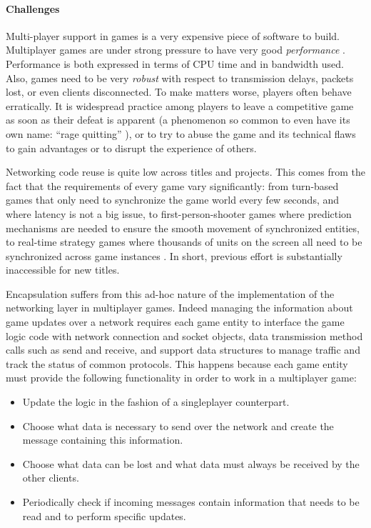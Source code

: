 \paragraph{Challenges}
Multi-player support in games is a very expensive piece of software to build. Multiplayer games are under strong pressure to have very good \textit{performance} \cite{claypool2006latency}. Performance is both expressed in terms of CPU time and in bandwidth used. Also, games need to be very \textit{robust} with respect to transmission delays, packets lost, or even clients disconnected. To make matters worse, players often behave erratically. It is widespread practice among players to leave a competitive game as soon as their defeat is apparent (a phenomenon so common to even have its own name: ``rage quitting'' \cite{rage_quitting}), or to try to abuse the game and its technical flaws to gain advantages or to disrupt the experience of others.

Networking code reuse is quite low across titles and projects. This comes from the fact that the requirements of every game vary significantly: from turn-based games that only need to synchronize the game world every few seconds, and where latency is not a big issue, to first-person-shooter games where prediction mechanisms are needed to ensure the smooth movement of synchronized entities, to real-time strategy games where thousands of units on the screen all need to be synchronized across game instances \cite{smed2002aspects}. In short, previous effort is substantially inaccessible for new titles. 

Encapsulation suffers from this ad-hoc nature of the implementation of the networking layer in multiplayer games. Indeed managing the information about game updates over a network requires each game entity to interface the game logic code with network connection and socket objects, data transmission method calls such as send and receive, and support data structures to manage traffic and track the status of common protocols. This happens because each game entity must provide the following functionality in order to work in a multiplayer game:

\begin{itemize}
	\item Update the logic in the fashion of a singleplayer counterpart.
	\item Choose what data is necessary to send over the network and create the message containing this information.
	\item Choose what data can be lost and what data must always be received by the other clients.
	\item Periodically check if incoming messages contain information that needs to be read and to perform specific updates.
\end{itemize}

